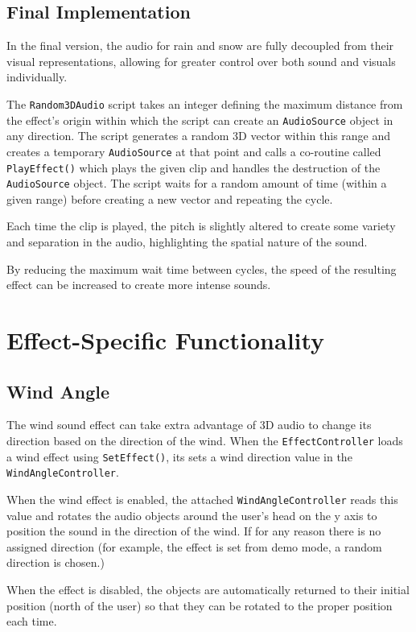 \documentclass{l4proj}
\begin{document}
\subsection{Final Implementation}

In the final version, the audio for rain and snow are fully decoupled from their visual representations, allowing for greater control over both sound and visuals individually.

The \texttt{Random3DAudio} script takes an integer defining the maximum distance from the effect's origin within which the script can create an \texttt{AudioSource} object in any direction. The script generates a random 3D vector within this range and creates a temporary \texttt{AudioSource} at that point and calls a co-routine called \texttt{PlayEffect()} which plays the given clip and handles the destruction of the \texttt{AudioSource} object. The script waits for a random amount of time (within a given range) before creating a new vector and repeating the cycle.

Each time the clip is played, the pitch is slightly altered to create some variety and separation in the audio, highlighting the spatial nature of the sound.

By reducing the maximum wait time between cycles, the speed of the resulting effect can be increased to create more intense sounds.


\section{Effect-Specific Functionality}
\subsection{Wind Angle}
The wind sound effect can take extra advantage of 3D audio to change its direction based on the direction of the wind. 
When the \texttt{EffectController} loads a wind effect using \texttt{SetEffect()}, its sets a wind direction value in the \texttt{WindAngleController}.

When the wind effect is enabled, the attached \texttt{WindAngleController} reads this value and rotates the audio objects around the user's head on the y axis to position the sound in the direction of the wind. If for any reason there is no assigned direction (for example, the effect is set from demo mode, a random direction is chosen.)

When the effect is disabled, the objects are automatically returned to their initial position (north of the user) so that they can be rotated to the proper position each time. 
\end{document}
